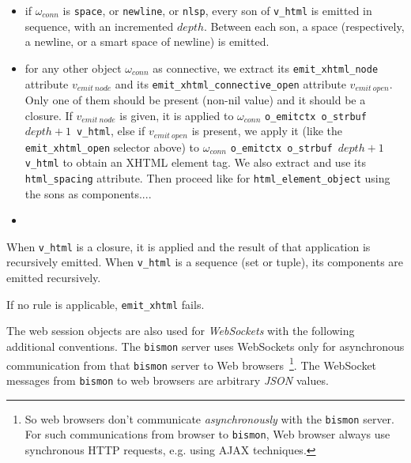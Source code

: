 \begin{itemize}
\item if $\omega_{conn}$ is \texttt{space}, or \texttt{newline}, or
  \texttt{nlsp}, every son of \texttt{v\_html} is emitted in sequence,
  with an incremented $depth$. Between each son, a space
  (respectively, a newline, or a smart space of newline) is emitted.
   


\item for any other object $\omega_{conn}$ as connective, we extract
  its \texttt{emit\_xhtml\_node} attribute $v_{emit~node}$ and its
  \texttt{emit\_xhtml\_connective\_open} attribute
  $v_{emit~open}$. Only one of them should be present (non-nil value)
  and it should be a closure. If $v_{emit~node}$ is given, it is
  applied to $\omega_{conn}$ \texttt{o\_emitctx o\_strbuf $depth + 1$
    v\_html}, else if $v_{emit~open}$ is present, we apply it (like
  the \texttt{emit\_xhtml\_open} selector above) to $\omega_{conn}$
  \texttt{o\_emitctx o\_strbuf $depth + 1$ v\_html} to obtain an XHTML
  element tag. We also extract and use its \texttt{html\_spacing}
  attribute. Then proceed like for \texttt{html\_element\_object}
  using the sons as components....
  
\item {\color{red}{@@ to be completed a lot.}}
  
\end{itemize}


When \texttt{v\_html} is a closure, it is applied {\color{red}{@@ to
    be completed}} and the result of that application is recursively
emitted. When \texttt{v\_html} is a sequence (set or tuple), its
components are emitted recursively.

If no rule is applicable, \texttt{emit\_xhtml} fails.

\medskip

The web session objects are also used for 
\emph{WebSockets} with the following additional conventions. The
\texttt{bismon} server uses WebSockets only for asynchronous
communication from that \texttt{bismon} server to Web
browsers~\footnote{So web browsers don't communicate
  \emph{asynchronously} with the \texttt{bismon} server. For such
  communications from browser to \texttt{bismon}, Web browser always
  use synchronous HTTP requests, e.g. using AJAX techniques.}. The
WebSocket messages from \texttt{bismon} to web browsers are arbitrary
\emph{JSON} values.

\bigskip

